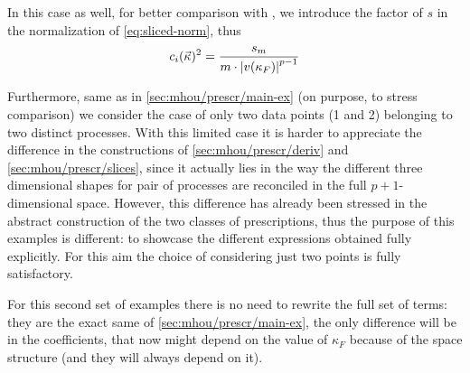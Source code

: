 In this case as well, for better comparison with \cite{NNPDF:2019ubu}, we
introduce the factor of $s$ in the normalization of \cref{eq:sliced-norm}, thus
\begin{equation}
    c_i(\vec{\kappa})^2 = \frac{s_m}{m \cdot \abs{v(\kappa_F)}^{p-1}}
\end{equation}

Furthermore, same as in \cref{sec:mhou/prescr/main-ex} (on purpose, to stress comparison)
we consider the case of only two data points (1 and 2) belonging to two
distinct processes.
With this limited case it is harder to appreciate the difference in the
constructions of \cref{sec:mhou/prescr/deriv} and \cref{sec:mhou/prescr/slices}, since it actually lies
in the way the different three dimensional shapes for pair of processes are
reconciled in the full $p+1$-dimensional space.
However, this difference has already been stressed in the abstract construction
of the two classes of prescriptions, thus the purpose of this examples is
different: to showcase the different expressions obtained fully explicitly.
For this aim the choice of considering just two points is fully satisfactory.

For this second set of examples there is no need to rewrite the full set of
terms: they are the exact same of \cref{sec:mhou/prescr/main-ex}, the only difference will
be in the coefficients, that now might depend on the value of $\kappa_F$
because of the space structure (and they will always depend on it).

